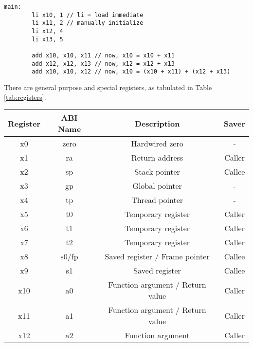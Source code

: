 \begin{lstlisting}[]
    main:
        li x10, 1 // li = load immediate
        li x11, 2 // manually initialize
        li x12, 4
        li x13, 5

        add x10, x10, x11 // now, x10 = x10 + x11
        add x12, x12, x13 // now, x12 = x12 + x13
        add x10, x10, x12 // now, x10 = (x10 + x11) + (x12 + x13)
\end{lstlisting}

There are general purpose and special
registers, as tabulated in Table \ref{tab:registers}.
\begin{table}[h!]
    \centering
    \begin{tabular}{|c|c|c|c|}
        \hline
        \textbf{Register} & \textbf{ABI Name} & \textbf{Description}             & \textbf{Saver} \\
        \hline
        x0                & zero              & Hardwired zero                   & -              \\
        x1                & ra                & Return address                   & Caller         \\
        x2                & sp                & Stack pointer                    & Callee         \\
        x3                & gp                & Global pointer                   & -              \\
        x4                & tp                & Thread pointer                   & -              \\
        x5                & t0                & Temporary register               & Caller         \\
        x6                & t1                & Temporary register               & Caller         \\
        x7                & t2                & Temporary register               & Caller         \\
        x8                & s0/fp             & Saved register / Frame pointer   & Callee         \\
        x9                & s1                & Saved register                   & Callee         \\
        x10               & a0                & Function argument / Return value & Caller         \\
        x11               & a1                & Function argument / Return value & Caller         \\
        x12               & a2                & Function argument                & Caller         \\

\end{tabular}
\end{table}

